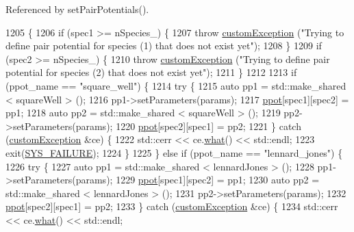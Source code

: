 Referenced by set\-Pair\-Potentials().


\begin{DoxyCode}
1205                                                                                                            
                                                \{
1206     \textcolor{keywordflow}{if} (spec1 >= nSpecies\_) \{
1207         \textcolor{keywordflow}{throw} \hyperlink{classcustom_exception}{customException} (\textcolor{stringliteral}{"Trying to define pair potential for species (1) that does
       not exist yet"});
1208     \}
1209     \textcolor{keywordflow}{if} (spec2 >= nSpecies\_) \{
1210         \textcolor{keywordflow}{throw} \hyperlink{classcustom_exception}{customException} (\textcolor{stringliteral}{"Trying to define pair potential for species (2) that does
       not exist yet"});
1211     \}
1212 
1213     \textcolor{keywordflow}{if} (ppot\_name == \textcolor{stringliteral}{"square\_well"}) \{
1214         \textcolor{keywordflow}{try} \{
1215             \textcolor{keyword}{auto} pp1 = std::make\_shared < squareWell > ();
1216             pp1->setParameters(params);
1217             \hyperlink{classsim_system_ad2e290b5963f132e6a3a56cee35c8e9f}{ppot}[spec1][spec2] = pp1;
1218             \textcolor{keyword}{auto} pp2 = std::make\_shared < squareWell > ();
1219             pp2->setParameters(params);
1220             \hyperlink{classsim_system_ad2e290b5963f132e6a3a56cee35c8e9f}{ppot}[spec2][spec1] = pp2;
1221         \} \textcolor{keywordflow}{catch} (\hyperlink{classcustom_exception}{customException} &ce) \{
1222             std::cerr << ce.\hyperlink{classcustom_exception_aeb6ab5848b038adfc68fde86a512f691}{what}() << std::endl;
1223             exit(\hyperlink{global_8h_a428dfe1ef0a6ff4b1fdebf275f6aff2e}{SYS\_FAILURE});
1224         \}
1225     \} \textcolor{keywordflow}{else} \textcolor{keywordflow}{if} (ppot\_name == \textcolor{stringliteral}{"lennard\_jones"}) \{
1226         \textcolor{keywordflow}{try} \{
1227             \textcolor{keyword}{auto} pp1 = std::make\_shared < lennardJones > ();
1228             pp1->setParameters(params);
1229             \hyperlink{classsim_system_ad2e290b5963f132e6a3a56cee35c8e9f}{ppot}[spec1][spec2] = pp1;
1230             \textcolor{keyword}{auto} pp2 = std::make\_shared < lennardJones > ();
1231             pp2->setParameters(params);
1232             \hyperlink{classsim_system_ad2e290b5963f132e6a3a56cee35c8e9f}{ppot}[spec2][spec1] = pp2;
1233         \} \textcolor{keywordflow}{catch} (\hyperlink{classcustom_exception}{customException} &ce) \{
1234             std::cerr << ce.\hyperlink{classcustom_exception_aeb6ab5848b038adfc68fde86a512f691}{what}() << std::endl;

\end{DoxyCode}
